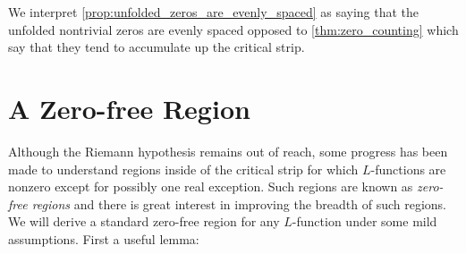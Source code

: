 \documentclass[12pt]{article}
\begin{document}
    We interpret \cref{prop:unfolded_zeros_are_evenly_spaced} as saying that the unfolded nontrivial zeros are evenly spaced opposed to \cref{thm:zero_counting} which say that they tend to accumulate up the critical strip.
  \section{A Zero-free Region}
    Although the Riemann hypothesis remains out of reach, some progress has been made to understand regions inside of the critical strip for which \(L\)-functions are nonzero except for possibly one real exception. Such regions are known as \textit{zero-free regions} and there is great interest in improving the breadth of such regions. We will derive a standard zero-free region for any \(L\)-function under some mild assumptions. First a useful lemma:
\end{document}
